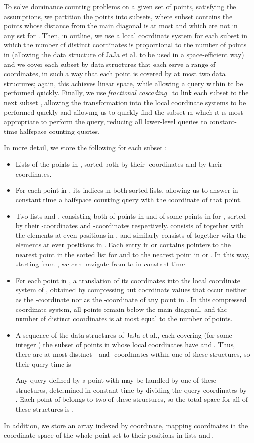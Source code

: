 \documentclass[11pt]{article}
\begin{document}
To solve dominance counting problems on a given set of points, satisfying the assumptions, we partition the points into subsets, where subset  contains the points whose distance from the main diagonal is at most  and which are not in any set  for .
Then, in outline, we use a local coordinate system for each subset  in which the number of distinct coordinates is proportional to the number of points in  (allowing the data structure of JaJa et al. to be used in a space-efficient way) and we cover each subset  by data structures that each serve a range of  coordinates, in such a way that each point is covered by at most two data structures; again, this achieves linear space, while allowing a query within  to be performed quickly. Finally, we use \emph{fractional cascading}~\cite{ChaGui-Algo-86} to link each subset  to the next subset , allowing the transformation into the local coordinate systems to be performed quickly and allowing us to quickly find the subset  in which it is most appropriate to perform the query, reducing all lower-level queries to constant-time halfspace counting queries.

In more detail, we store the following for each subset :
\begin{itemize}
\item Lists of the points in , sorted both by their -coordinates and by their -coordinates.
\item For each point in , its indices in both sorted lists, allowing us to answer in constant time a halfspace counting query with the coordinate of that point.
\item Two lists  and , consisting both of points in  and of some points in  for , sorted by their -coordinates and -coordinates respectively.  consists of  together with the elements at even positions in , and similarly  consists of  together with the elements at even positions in . Each entry in  or  contains pointers to the nearest point in the sorted list for  and to the nearest point in  or . In this way, starting from , we can navigate from  to  in constant time.
\item For each point in , a translation of its coordinates into the local coordinate system of , obtained by compressing out coordinate values that occur neither as the -coordinate nor as the -coordinate of any point in . In this compressed coordinate system, all points remain below the main diagonal, and the number of distinct coordinates is at most equal to the number of points.
\item A sequence of the data structures of JaJa et al., each covering (for some integer ) the subset of points in  whose local coordinates have  and . Thus, there are at most  distinct - and -coordinates within one of these structures, so their query time is

Any query defined by a point  with  may be handled by one of these structures, determined in constant time by dividing the query coordinates by . Each point of  belongs to two of these structures, so the total space for all of these structures is .
\end{itemize}
In addition, we store an array indexed by coordinate, mapping coordinates in the coordinate space of the whole point set to their positions in lists  and .
\end{document}
